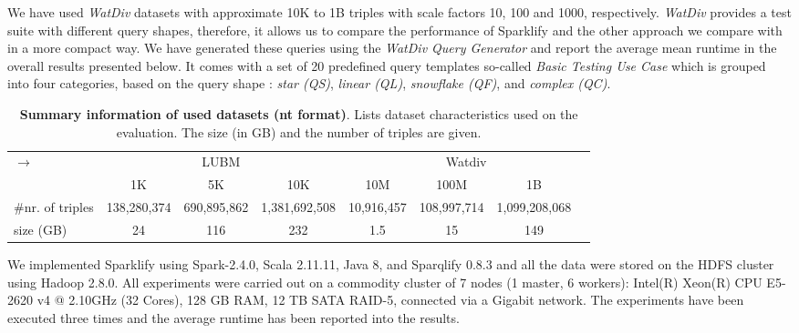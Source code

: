 We have used \textit{WatDiv} datasets with approximate 10K to 1B triples with scale factors 10, 100 and 1000, respectively. 
\textit{WatDiv} provides a test suite with different query shapes, therefore, it allows us to compare the performance of Sparklify and the other approach we compare with in a more compact way.
We have generated these queries using the \textit{WatDiv Query Generator} and report the average mean runtime in the overall results presented below.
It comes with a set of 20 predefined query templates so-called \textit{Basic Testing Use Case} which is grouped into four categories, based on the query shape : \textit{star (QS)}, \textit{linear (QL)}, \textit{snowflake (QF)}, and \textit{complex (QC)}.

\begin{table}
\centering
\begin{tabularx}{\textwidth}{Xccccccc}	
\toprule
\multirow{2}{*}{$\longrightarrow$} & \multicolumn{3}{c|}{LUBM} & \multicolumn{4}{c}{Watdiv} \\
\cline{2-8}  \rule{0pt}{10pt}
&   \scriptsize{1K} & \scriptsize{5K} & \scriptsize{10K}  & \scriptsize{10M} &\scriptsize{100M} &\scriptsize{1B} &\\
\midrule
\scriptsize{\#nr. of triples}& \scriptsize{138,280,374} & \scriptsize{690,895,862} & \scriptsize{1,381,692,508} & \scriptsize{10,916,457} & \scriptsize{108,997,714} & \scriptsize{1,099,208,068} &  \\
\scriptsize{size (GB)}  & \scriptsize{24} & \scriptsize{116} & \scriptsize{232} & \scriptsize{1.5} &\scriptsize{15} &\scriptsize{149} &\\
\bottomrule
\end{tabularx}
{\caption{\textbf{Summary information of used datasets (nt format)}.
Lists dataset characteristics used on the evaluation.
The size (in GB) and the number of triples are given.}
\label{tab:sparklify-dataset_info}}
\end{table}

We implemented Sparklify using Spark-2.4.0, Scala 2.11.11, Java 8, and Sparqlify 0.8.3 and all the data were stored on the \gls{HDFS} cluster using Hadoop 2.8.0.
All experiments were carried out on a commodity cluster of 7 nodes (1 master, 6 workers): Intel(R) Xeon(R) CPU E5-2620 v4 @ 2.10GHz (32 Cores), 128 GB RAM, 12 TB SATA RAID-5, connected via a Gigabit network.
The experiments have been executed three times and the average runtime has been reported into the results.

